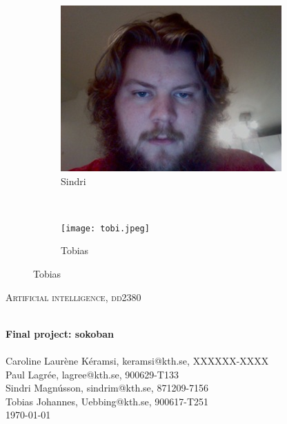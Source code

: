 \documentclass[a4paper,10pt]{article}
\begin{document}
\begin{titlepage}
\begin{center}
\begin{figure}[h]
        \begin{subfigure}[b]{0.2\textwidth}
                \centering
                \includegraphics[width=\textwidth]{sindri.jpeg}
                \caption{Sindri}
                \label{fig:Sindri}
        \end{subfigure}
          ~ %
        \begin{subfigure}[b]{0.2\textwidth}
                \centering
                \texttt{[image: tobi.jpeg]}
                \caption{Tobias}
                \label{fig:Tobias}
        \end{subfigure}
\end{figure}

\textsc{\Large Artificial intelligence, dd2380 }  %

\hrulefill \\[0.4cm]
{ \huge \bfseries Final project: sokoban}\\[0.4cm]
\hrulefill \\[1.5cm]



    Caroline Laurène Kéramsi, keramsi@kth.se, XXXXXX-XXXX \\
    Paul Lagrée, lagree@kth.se, 900629-T133 \\
    Sindri Magnússon, sindrim@kth.se, 871209-7156 \\
    Tobias Johannes, Uebbing@kth.se, 900617-T251 \\


\vfill
{\large \today}

\end{center}
\end{titlepage}
\end{document}
